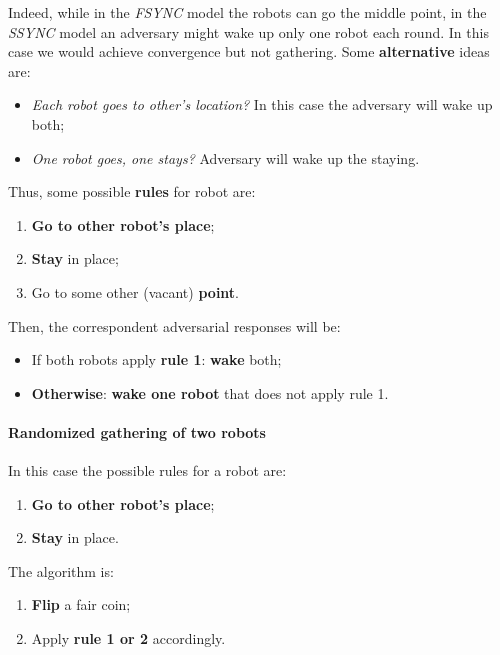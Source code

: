 Indeed, while in the \textit{FSYNC} model the robots can go the middle point, in the \textit{SSYNC} model an adversary might wake up only one robot each round. In this case we would achieve convergence but not gathering. Some \textbf{alternative} ideas are:
\begin{itemize}
    \item \textit{Each robot goes to other’s location?} In this case the adversary will wake up both;
    \item \textit{One robot goes, one stays?} Adversary will wake up the staying.
\end{itemize}

Thus, some possible \textbf{rules} for robot are:
\begin{enumerate}
    \item \textbf{Go to other robot’s place};
    \item \textbf{Stay} in place;
    \item Go to some other (vacant) \textbf{point}.
\end{enumerate}

Then, the correspondent adversarial responses will be:
\begin{itemize}
    \item If both robots apply \textbf{rule 1}: \textbf{wake} both;
    \item \textbf{Otherwise}: \textbf{wake one robot} that does not apply rule 1.
\end{itemize}

\paragraph{Randomized gathering of two robots}
In this case the possible rules for a robot are:
\begin{enumerate}
    \item \textbf{Go to other robot's place};
    \item \textbf{Stay} in place.
\end{enumerate}

The algorithm is:
\begin{enumerate}
    \item \textbf{Flip} a fair coin;
    \item Apply \textbf{rule 1 or 2} accordingly.
\end{enumerate}


